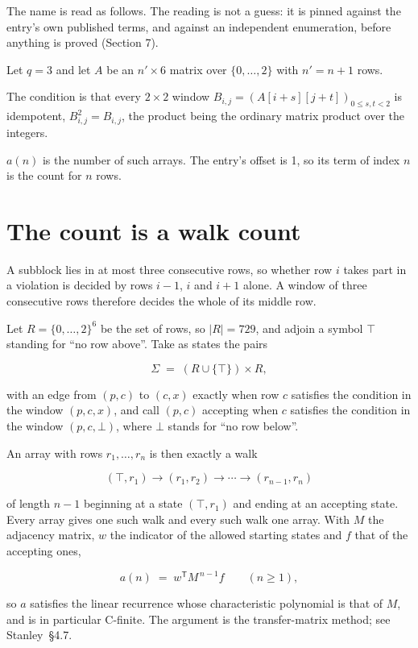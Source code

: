 \documentclass[11pt]{article}
\theoremstyle{definition}
\begin{document}
The name is read as follows. The reading is not a guess: it is pinned against the entry's own published terms, and against an independent enumeration, before anything is proved (Section 7).

Let $q = 3$ and let $A$ be an $n' \times 6$ matrix over $\{0,\dots,2\}$ with $n' = n + 1$ rows.

The condition is that every $2 \times 2$ window $B_{i,j} = (A[i{+}s][j{+}t])_{0 \le s,t < 2}$ is idempotent, $B_{i,j}^2 = B_{i,j}$, the product being the ordinary matrix product over the integers.

$a(n)$ is the number of such arrays. The entry's offset is 1, so its term of index $n$ is the count for $n$ rows.

\section{The count is a walk count}

A subblock lies in at most three consecutive rows, so whether row $i$ takes part in a violation is decided by rows $i-1$, $i$ and $i+1$ alone. A window of three consecutive rows therefore decides the whole of its middle row.

Let $R = \{0,\dots,2\}^{6}$ be the set of rows, so $|R| = 729$, and adjoin a symbol $\top$ standing for ``no row above''. Take as states the pairs

\[\Sigma \;=\; (R \cup \{\top\}) \times R,\]

with an edge from $(p,c)$ to $(c,x)$ exactly when row $c$ satisfies the condition in the window $(p,c,x)$, and call $(p,c)$ accepting when $c$ satisfies the condition in the window $(p,c,\bot)$, where $\bot$ stands for ``no row below''.

An array with rows $r_1,\dots,r_n$ is then exactly a walk

\[(\top,r_1) \to (r_1,r_2) \to \cdots \to (r_{n-1},r_n)\]

of length $n-1$ beginning at a state $(\top,r_1)$ and ending at an accepting state. Every array gives one such walk and every such walk one array. With $M$ the adjacency matrix, $w$ the indicator of the allowed starting states and $f$ that of the accepting ones,

\[a(n) \;=\; w^{\mathsf T} M^{\,n-1} f \qquad (n \ge 1),\]

so $a$ satisfies the linear recurrence whose characteristic polynomial is that of $M$, and is in particular C-finite. The argument is the transfer-matrix method; see Stanley~\S4.7.
\end{document}
